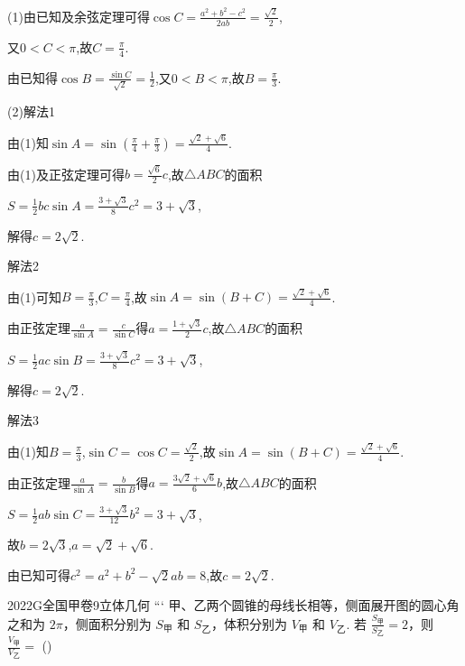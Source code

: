 \documentclass[12pt,UTF-8,a4paper]{ctexart}
\numberwithin{figure}{section}
\theoremstyle{mystyle}
\theoremstyle{mystylekaishu}
\theoremstyle{mystyle}
\numberwithin{xiti}{section}
\begin{document}
\begin{solutions}
(1)由已知及余弦定理可得$\cos C=\frac{a^{2}+b^{2}-c^{2}}{2ab}=\frac{\sqrt{2}}{2}$,

又$0<C<\pi$,故$C=\frac{\pi}{4}$.

由已知得$\cos B=\frac{\sin C}{\sqrt{2}}=\frac{1}{2}$,又$0<B<\pi$,故$B=\frac{\pi}{3}$.

(2)解法1

由(1)知$\sin A=\sin\left(\frac{\pi}{4}+\frac{\pi}{3}\right)=\frac{\sqrt{2}+\sqrt{6}}{4}$.

由(1)及正弦定理可得$b=\frac{\sqrt{6}}{2}c$,故$\triangle ABC$的面积

$S=\frac{1}{2}bc\sin A=\frac{3+\sqrt{3}}{8}c^{2}=3+\sqrt{3}$,

解得$c=2\sqrt{2}$.

解法2

由(1)可知$B=\frac{\pi}{3}$,$C=\frac{\pi}{4}$,故$\sin A=\sin(B+C)=\frac{\sqrt{2}+\sqrt{6}}{4}$.

由正弦定理$\frac{a}{\sin A}=\frac{c}{\sin C}$得$a=\frac{1+\sqrt{3}}{2}c$,故$\triangle ABC$的面积

$S=\frac{1}{2}ac\sin B=\frac{3+\sqrt{3}}{8}c^{2}=3+\sqrt{3}$,

解得$c=2\sqrt{2}$.

解法3

由(1)知$B=\frac{\pi}{3}$,$\sin C=\cos C=\frac{\sqrt{2}}{2}$,故$\sin A=\sin(B+C)=\frac{\sqrt{2}+\sqrt{6}}{4}$.

由正弦定理$\frac{a}{\sin A}=\frac{b}{\sin B}$得$a=\frac{3\sqrt{2}+\sqrt{6}}{6}b$,故$\triangle ABC$的面积

$S=\frac{1}{2}ab\sin C=\frac{3+\sqrt{3}}{12}b^{2}=3+\sqrt{3}$,

故$b=2\sqrt{3}$,$a=\sqrt{2}+\sqrt{6}$.

由已知可得$c^{2}=a^{2}+b^{2}-\sqrt{2}ab=8$,故$c=2\sqrt{2}$.
\end{solutions}


\begin{problem}{2022}{G}{全国甲卷}{9}{立体几何}
```
甲、乙两个圆锥的母线长相等，侧面展开图的圆心角之和为 $2 \pi$，侧面积分别为 $S_{\text{甲}}$ 和 $S_{\text{乙}}$，体积分别为 $V_{\text{甲}}$ 和 $V_{\text{乙}}$. 若 $\frac{S_{\text{甲}}}{S_{\text{乙}}}=2$，则 $\frac{V_{\text{甲}}}{V_{\text{乙}}}=$ (\hspace{1cm})
\begin{choices}
\end{choices}
\end{problem}
\end{document}
